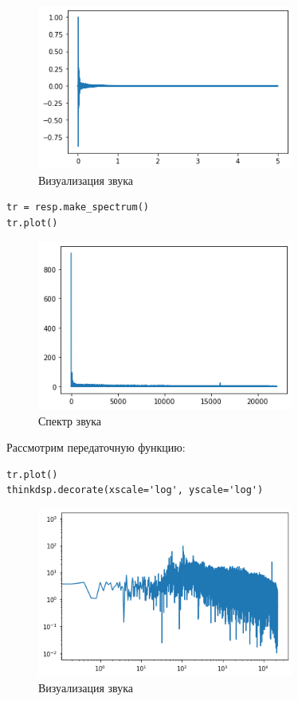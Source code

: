 \documentclass[a4paper,12pt]{report}
\begin{document}
\begin{figure}[H]
        \centering
        \includegraphics[width=0.75\textwidth]{9.png}
        \caption{Визуализация звука}
        \label{9}
\end{figure}


\begin{lstlisting}[caption=Спектр звука]
tr = resp.make_spectrum()
tr.plot()
\end{lstlisting}

\begin{figure}[H]
        \centering
        \includegraphics[width=0.75\textwidth]{10.png}
        \caption{Спектр звука}
        \label{10}
\end{figure}

Рассмотрим передаточную функцию:

\begin{lstlisting}[caption=Визуализация звука]
tr.plot()
thinkdsp.decorate(xscale='log', yscale='log')
\end{lstlisting}

\begin{figure}[H]
        \centering
        \includegraphics[width=0.75\textwidth]{11.png}
        \caption{Визуализация звука}
        \label{11}
\end{figure}
\end{document}
